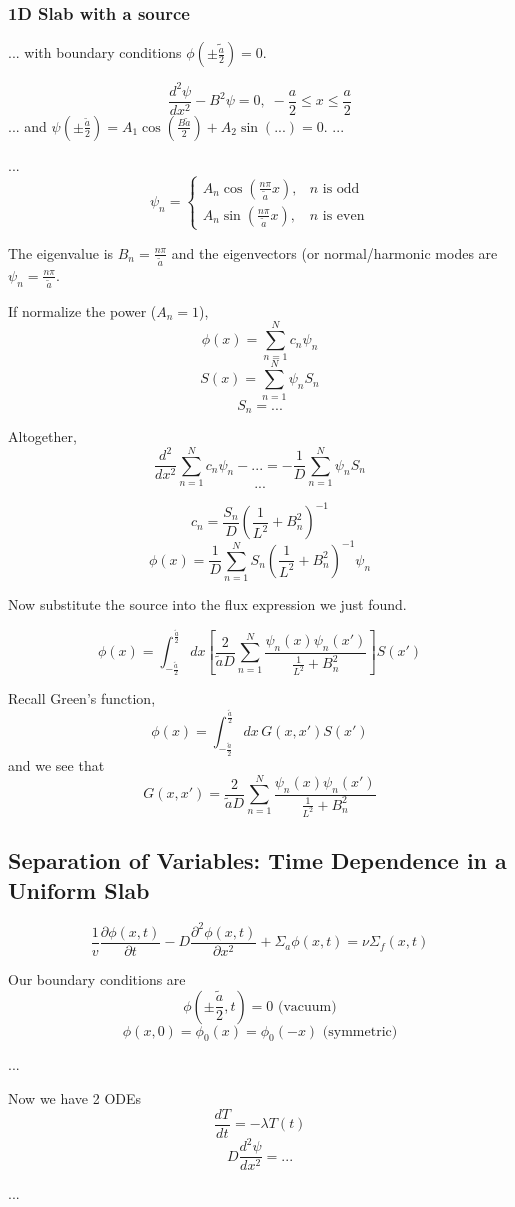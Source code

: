 \documentclass{report}
\newcommand{\hh}[1]{\subsection*{#1}}
\newcommand{\hhh}[1]{\subsubsection*{#1}}
\newcommand{\p}{\partial}
\newcommand{\Xs}{\Sigma}
\newcommand{\Oov}{\frac{1}{v}}
\newcommand{\oneDgreens}{G(x,x')}
\begin{document}
\hhh{1D Slab with a source}
...
with boundary conditions $\phi(\pm\tilde{\frac{a}{2}}) = 0$.

$$ \frac{d^2\psi}{dx^2} - B^2\psi = 0, \; -\frac{a}{2} \leq x \leq \frac{a}{2} $$
...
and $\psi(\pm\frac{\tilde{a}}{2}) = A_1 \cos(\frac{B\tilde{a}}{2}) + A_2\sin(...) = 0 $.
...

...
$$ \psi_n =	\begin{cases}	A_n\cos(\frac{n\pi}{\tilde{a}}x),	& n \text{ is odd} \\
							A_n\sin(\frac{n\pi}{\tilde{a}}x), 	& n \text{ is even}						\end{cases}$$
							
The eigenvalue is $B_n = \frac{n\pi}{\tilde{a}}$ and the eigenvectors (or normal/harmonic modes are $\psi_n = \frac{n\pi}{\tilde{a}}$.

If normalize the power ($A_n = 1$),
$$ \phi(x) = \sum_{n=1}^N c_n \psi_n $$
$$ S(x) = \sum_{n=1}^N \psi_n S_n $$
$$ S_n = ... $$

Altogether,
$$ \frac{d^2}{dx^2} \sum_{n=1}^N c_n \psi_n - ... = -\frac{1}{D}\sum_{n=1}^N \psi_n S_n $$
$$ ... $$

$$ c_n = \frac{S_n}{D}\left(\frac{1}{L^2} + B_n^2\right)^{-1} $$
$$ \phi(x) = \frac{1}{D}\sum_{n=1}^N S_n\left( \frac{1}{L^2} + B_n^2 \right)^{-1} \psi_n $$

Now substitute the source into the flux expression we just found.

$$ \phi(x) = \int_{-\frac{\tilde{a}}{2}}^{\frac{\tilde{a}}{2}} dx \left[ \frac{2}{\tilde{a}D} \sum_{n=1}^N \frac{\psi_n(x)\psi_n(x')}{\frac{1}{L^2} + B_n^2 }\right] S(x') $$

Recall Green's function,
$$ \phi(x) = \int_{-\frac{\tilde{a}}{2}}^{\frac{\tilde{a}}{2}} dx \,\oneDgreens S(x') $$
and we see that 
$$ \oneDgreens = \frac{2}{\tilde{a}D} \sum_{n=1}^N \frac{\psi_n(x)\psi_n(x')}{\frac{1}{L^2} + B_n^2 }$$


\hh{Separation of Variables: Time Dependence in a Uniform Slab}

$$ \Oov \frac{\p\phi(x,t)}{\p t} - D\frac{\p^2\phi(x,t)}{\p x^2} + \Xs_a \phi(x,t) = \nu\Xs_f(x,t)$$

Our boundary conditions are 
$$ \phi(\pm\frac{\tilde{a}}{2},t) = 0 \text{ (vacuum)}$$
$$ \phi(x,0) = \phi_0(x) = \phi_0(-x) \text{ (symmetric)}$$


...

Now we have 2 ODEs
$$ \frac{dT}{dt} = -\lambda T(t) $$
$$ D\frac{d^2\psi}{dx^2} = ... $$

...
\end{document}

